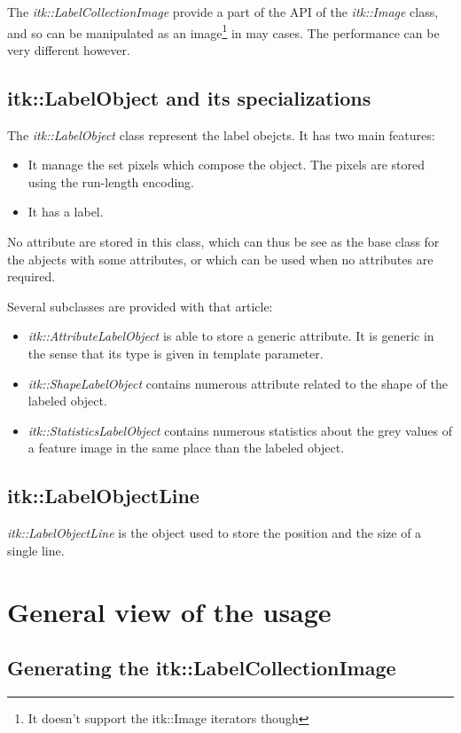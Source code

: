 \documentclass{InsightArticle}
\begin{document}
The {\em itk::LabelCollectionImage} provide a part of the API of the {\em itk::Image} class,
and so can be manipulated as an image\footnote{It doesn't support the itk::Image iterators though}
in may cases. The performance can be very different however.

\subsection{itk::LabelObject and its specializations}

The {\em itk::LabelObject} class represent the label obejcts. It has two main features:
\begin{itemize}
  \item It manage the set pixels which compose the object. The pixels are stored using the run-length encoding.
  \item It has a label.
\end{itemize}

No attribute are stored in this class, which can thus be see as the base class for the abjects with some attributes, or which can be used when no attributes are required.

Several subclasses are provided with that article:
\begin{itemize}
  \item {\em itk::AttributeLabelObject} is able to store a generic attribute. It is generic in the sense that its type is given in template parameter.
  \item {\em itk::ShapeLabelObject} contains numerous attribute related to the shape of the labeled object.
  \item {\em itk::StatisticsLabelObject} contains numerous statistics about the grey values of a feature image in the same place than the labeled object.
\end{itemize}


\subsection{itk::LabelObjectLine}

{\em itk::LabelObjectLine} is the object used to store the position and the size of a single line.

\section{General view of the usage}

\subsection{Generating the itk::LabelCollectionImage}
\end{document}
